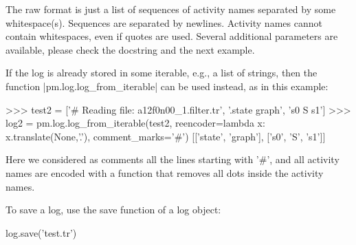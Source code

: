 \documentclass[a4paper,10pt]{book}
\begin{document}
The raw format is just a list of sequences of activity names separated by some whitespace(s). Sequences are separated by newlines. Activity names cannot contain whitespaces, even if quotes are used. Several additional parameters are available, please check the docstring and the next example.

If the log is already stored in some iterable, e.g., a list of strings, then the function |pm.log.log_from_iterable|
can be used instead, as in this example:\\
\begin{pycode}
>>> test2 = ['# Reading file: a12f0n00_1.filter.tr', '.state graph', 's0 S s1']
>>> log2 = pm.log.log_from_iterable(test2,
				    reencoder=lambda x: x.translate(None,'.'),
				    comment_marks='#')
[['state', 'graph'], ['s0', 'S', 's1']]
\end{pycode}

Here we considered as comments all the lines starting with '\#', and all activity names are encoded with a function that removes all dots inside the activity names.

To save a log, use the save function of a log object:\\
\begin{pycode}
log.save('test.tr')
\end{pycode}
\end{document}

